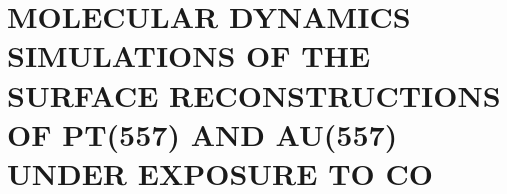 
\chapter{MOLECULAR DYNAMICS SIMULATIONS OF THE SURFACE RECONSTRUCTIONS OF PT(557) AND AU(557) UNDER EXPOSURE TO CO}

